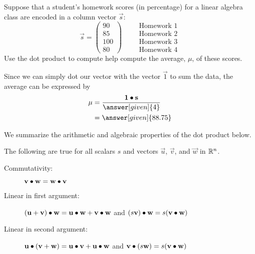 \documentclass{ximera}
\begin{document}
\begin{example}
  Suppose that a student's homework scores (in percentage) for a
  linear algebra class are encoded in a column vector $\vec{s}$:
  \[
    \vec{s} =
    \begin{pmatrix}
      90 \\ 85 \\ 100 \\ 80
    \end{pmatrix}
    \qquad
    \begin{array}{l}
      \text{Homework 1}\\
      \text{Homework 2}\\
      \text{Homework 3}\\
      \text{Homework 4}
    \end{array}
    \]
    Use the dot product to compute help compute the average, $\mu$, of
    these scores.
  \begin{explanation}
   Since we can simply dot our vector with the vector $\vec{1}$ to sum
   the data, the average can be expressed by
    \begin{align*}
      \mu
      & = \frac{\vec{1} \dotp \vec{s}}{\answer[given]{4}}\\
      &=\answer[given]{88.75}
    \end{align*}
  \end{explanation}
\end{example}






We summarize the arithmetic and algebraic properties of the dot
product below.
\begin{theorem}
  The following are true for all scalars $s$ and vectors
  $\vec{u}$, $\vec{v}$, and $\vec{w}$ in $\mathbb{R}^n$.
  \begin{description}
  \item[Commutativity:] $\mathbf{v} \bullet \mathbf{w} = \mathbf{w} \bullet
    \mathbf{v}$
  \item[Linear in first argument:] $(\mathbf{u}+\mathbf{v})\bullet \mathbf{w} = \mathbf{u}\bullet \mathbf{w} +
    \mathbf{v}\bullet \mathbf{w}$ and $(s\mathbf{v})\bullet \mathbf{w} = s(\mathbf{v}
    \bullet \mathbf{w})$
  \item[Linear in second argument:] $\mathbf{u} \bullet (\mathbf{v}+\mathbf{w}) = \mathbf{u}\bullet \mathbf{v}+
    \mathbf{u}\bullet \mathbf{w}$ and $\mathbf{v} \bullet (s\mathbf{w}) = s(\mathbf{v}
    \bullet \mathbf{w})$
  \end{description}
\end{theorem}
\end{document}
